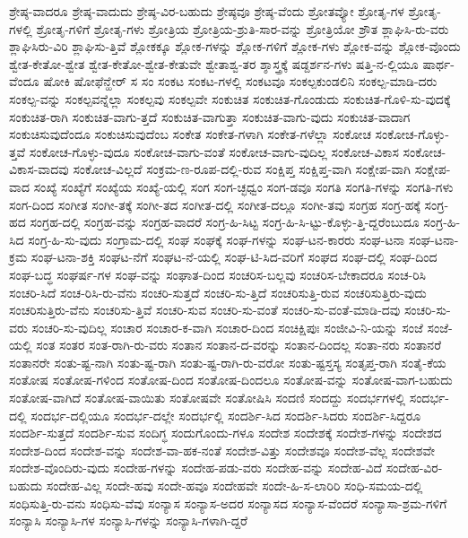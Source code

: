 {ಶ್ರೇಷ್ಠ-ವಾದರೂ
ಶ್ರೇಷ್ಠ-ವಾದುದು
ಶ್ರೇಷ್ಠ-ವಿರ-ಬಹುದು
ಶ್ರೇಷ್ಠವೂ
ಶ್ರೇಷ್ಠ-ವೆಂದು
ಶ್ರೋತವ್ಯೋ
ಶ್ರೋತೃ-ಗಳ
ಶ್ರೋತೃ-ಗಳಲ್ಲಿ
ಶ್ರೋತೃ-ಗಳಿಗೆ
ಶ್ರೋತೃ-ಗಳು
ಶ್ರೋತ್ರಿಯ
ಶ್ರೋತ್ರಿಯ-ಶ್ರುತಿ-ಸಾರ-ವನ್ನು
ಶ್ರೋತ್ರಿಯೋ
ಶ್ರೌತ
ಶ್ಲಾಘಿಸಿ-ರು-ವರು
ಶ್ಲಾಘಿಸಿರು-ವಿರಿ
ಶ್ಲಾಘಿಸು-ತ್ತಿವೆ
ಶ್ಲೋಕಕ್ಕೂ
ಶ್ಲೋಕ-ಗಳನ್ನು
ಶ್ಲೋಕ-ಗಳಿಗೆ
ಶ್ಲೋಕ-ಗಳು
ಶ್ಲೋಕ-ವನ್ನು
ಶ್ಲೋಕ-ವೊಂದು
ಶ್ವೇತ-ಕೇತೋ-ಶ್ವೇತ
ಶ್ವೇತ-ಕೇತೋ-ಶ್ವೇತ-ಕೇತುವೇ
ಶ್ವೇತಾಶ್ವ-ತರ
ಶ್ಶಾಸ್ತ್ರಕ್ಕೆ
ಷಡ್ದರ್ಶನ-ಗಳು
ಷತ್ತಿ-ನ-ಲ್ಲಿಯೂ
ಷಾರ್ಥ-ವೆಂದೂ
ಷೋಕಿ
ಷೋಫೆನ್ಹೇರ್
ಸ
ಸಂ
ಸಂಕಟ
ಸಂಕಟ-ಗಳಲ್ಲಿ
ಸಂಕಟವೂ
ಸಂಕಲ್ಪಕುಂಡಲಿನಿ
ಸಂಕಲ್ಪ-ಮಾಡಿ-ದರು
ಸಂಕಲ್ಪ-ವನ್ನು
ಸಂಕಲ್ಪವನ್ನೆಲ್ಲಾ
ಸಂಕಲ್ಪವು
ಸಂಕಲ್ಪವೇ
ಸಂಕುಚಿತ
ಸಂಕುಚಿತ-ಗೊಂಡುದು
ಸಂಕುಚಿತ-ಗೊಳಿ-ಸು-ವುದಕ್ಕೆ
ಸಂಕುಚಿತ-ರಾಗಿ
ಸಂಕುಚಿತ-ವಾಗು-ತ್ತದೆ
ಸಂಕುಚಿತ-ವಾಗುತ್ತಾ
ಸಂಕುಚಿತ-ವಾಗು-ವುದು
ಸಂಕುಚಿತ-ವಾದಾಗ
ಸಂಕುಚಿಸುವುದೆಂದೂ
ಸಂಕುಚಿಸುವುದೆಂಬ
ಸಂಕೇತ
ಸಂಕೇತ-ಗಳಾಗಿ
ಸಂಕೇತ-ಗಳೆಲ್ಲಾ
ಸಂಕೋಚ
ಸಂಕೋಚ-ಗೊಳ್ಳು-ತ್ತವೆ
ಸಂಕೋಚ-ಗೊಳ್ಳು-ವುದೂ
ಸಂಕೋಚ-ವಾಗು-ವಂತೆ
ಸಂಕೋಚ-ವಾಗು-ವುದಿಲ್ಲ
ಸಂಕೋಚ-ವಿಕಾಸ
ಸಂಕೋಚ-ವಿಕಾಸ-ವಾದವು
ಸಂಕೋಚ-ವಿಲ್ಲದೆ
ಸಂಕ್ರಮ-ಣ-ರೂಪ-ದಲ್ಲಿ-ರುವ
ಸಂಕ್ಷಿಪ್ತ
ಸಂಕ್ಷಿಪ್ತ-ವಾಗಿ
ಸಂಕ್ಷೇಪ-ವಾಗಿ
ಸಂಕ್ಷೇಪ-ವಾದ
ಸಂಖ್ಯೆ
ಸಂಖ್ಯೆಗೆ
ಸಂಖ್ಯೆಯ
ಸಂಖ್ಯೆ-ಯಲ್ಲಿ
ಸಂಗ
ಸಂಗ-ಚ್ಛಧ್ವಂ
ಸಂಗ-ಡವೂ
ಸಂಗತಿ
ಸಂಗತಿ-ಗಳನ್ನು
ಸಂಗತಿ-ಗಳು
ಸಂಗ-ದಿಂದ
ಸಂಗೀತ
ಸಂಗೀ-ತಕ್ಕೆ
ಸಂಗೀ-ತದ
ಸಂಗೀತ-ದಲ್ಲಿ
ಸಂಗೀತ-ದಲ್ಲೂ
ಸಂಗೀ-ತವು
ಸಂಗ್ರಹ
ಸಂಗ್ರ-ಹಕ್ಕೆ
ಸಂಗ್ರ-ಹದ
ಸಂಗ್ರಹ-ದಲ್ಲಿ
ಸಂಗ್ರಹ-ವನ್ನು
ಸಂಗ್ರಹ-ವಾದರೆ
ಸಂಗ್ರ-ಹಿ-ಸಿಟ್ಟ
ಸಂಗ್ರ-ಹಿ-ಸಿ-ಟ್ಟು-ಕೊಳ್ಳು-ತ್ತಿ-ದ್ದರೆಂಬುದೂ
ಸಂಗ್ರ-ಹಿ-ಸಿದ
ಸಂಗ್ರ-ಹಿ-ಸು-ವುದು
ಸಂಗ್ರಾಮ-ದಲ್ಲಿ
ಸಂಘ
ಸಂಘಕ್ಕೆ
ಸಂಘ-ಗಳನ್ನು
ಸಂಘ-ಟನ-ಕಾರರು
ಸಂಘ-ಟನಾ
ಸಂಘ-ಟನಾ-ಕ್ರಮ
ಸಂಘ-ಟನಾ-ಶಕ್ತಿ
ಸಂಘಟ-ನೆಗೆ
ಸಂಘಟ-ನೆ-ಯಲ್ಲಿ
ಸಂಘ-ಟಿ-ಸಿದ-ವರಿಗೆ
ಸಂಘದ
ಸಂಘ-ದಲ್ಲಿ
ಸಂಘ-ದಿಂದ
ಸಂಘ-ಬದ್ಧ
ಸಂಘರ್ಷ-ಗಳ
ಸಂಘ-ವನ್ನು
ಸಂಘಾತ-ದಿಂದ
ಸಂಚರಿಸ-ಬಲ್ಲವು
ಸಂಚರಿಸ-ಬೇಕಾದರೂ
ಸಂಚ-ರಿಸಿ
ಸಂಚರಿ-ಸಿದೆ
ಸಂಚ-ರಿಸಿ-ರು-ವೆನು
ಸಂಚರಿ-ಸುತ್ತದೆ
ಸಂಚರಿ-ಸು-ತ್ತಿದೆ
ಸಂಚರಿಸುತ್ತಿ-ರುವ
ಸಂಚರಿಸುತ್ತಿರು-ವುದು
ಸಂಚರಿಸುತ್ತಿರು-ವೆನು
ಸಂಚರಿಸು-ತ್ತಿವೆ
ಸಂಚರಿ-ಸುವ
ಸಂಚರಿ-ಸು-ವಂತೆ
ಸಂಚರಿ-ಸು-ವಂತೆ-ಮಾಡಿ-ದವು
ಸಂಚರಿ-ಸು-ವರು
ಸಂಚರಿ-ಸು-ವುದಿಲ್ಲ
ಸಂಚಾರ
ಸಂಚಾರ-ಕ-ವಾಗಿ
ಸಂಚಾರ-ದಿಂದ
ಸಂಚಿಕ್ಷಿಪುಃ
ಸಂಜೀವಿ-ನಿ-ಯನ್ನು
ಸಂಜೆ
ಸಂಜೆ-ಯಲ್ಲಿ
ಸಂತ
ಸಂತರ
ಸಂತ-ರಾಗಿ-ರು-ವರು
ಸಂತಾನ
ಸಂತಾನ-ದ-ವರನ್ನು
ಸಂತಾನ-ದಿಂದಲ್ಲ
ಸಂತಾ-ನರು
ಸಂತಾನರೆ
ಸಂತಾನರೇ
ಸಂತು-ಷ್ಟ-ನಾಗಿ
ಸಂತು-ಷ್ಟ-ರಾಗಿ
ಸಂತು-ಷ್ಟ-ರಾಗಿ-ರು-ವರೋ
ಸಂತು-ಷ್ಟಸ್ತಸ್ಯ
ಸಂತೃಪ್ತ-ರಾಗಿ
ಸಂತೈ-ಕೆಯ
ಸಂತೋಷ
ಸಂತೋಷ-ಗಳಿಂದ
ಸಂತೋಷ-ದಿಂದ
ಸಂತೋಷ-ದಿಂದಲೂ
ಸಂತೋಷ-ವನ್ನು
ಸಂತೋಷ-ವಾಗ-ಬಹುದು
ಸಂತೋಷ-ವಾಗಿದೆ
ಸಂತೋಷ-ವಾಯಿತು
ಸಂತೋಷವೇ
ಸಂತೋಷಿಸಿ
ಸಂದಣಿ
ಸಂದದ್ದು
ಸಂದರ್ಭಗಳಲ್ಲಿ
ಸಂದರ್ಭ-ದಲ್ಲಿ
ಸಂದರ್ಭ-ದಲ್ಲಿಯೂ
ಸಂದರ್ಭ-ದಲ್ಲೇ
ಸಂದರ್ಭಲ್ಲಿ
ಸಂದರ್ಶಿ-ಸಿದ
ಸಂದರ್ಶಿ-ಸಿದರು
ಸಂದರ್ಶಿ-ಸಿದ್ದರೂ
ಸಂದರ್ಶಿ-ಸುತ್ತದೆ
ಸಂದರ್ಶಿ-ಸುವ
ಸಂದಿಗ್ಧ
ಸಂದುಗೊಂದು-ಗಳೂ
ಸಂದೇಶ
ಸಂದೇಶಕ್ಕೆ
ಸಂದೇಶ-ಗಳನ್ನು
ಸಂದೇಶದ
ಸಂದೇಶ-ದಿಂದ
ಸಂದೇಶ-ವನ್ನು
ಸಂದೇಶ-ವಾ-ಹಕ-ನಂತೆ
ಸಂದೇಶ-ವಿತ್ತು
ಸಂದೇಶವೂ
ಸಂದೇಶ-ವೆಲ್ಲ
ಸಂದೇಶವೇ
ಸಂದೇಶ-ವೊಂದಿರು-ವುದು
ಸಂದೇಹ-ಗಳನ್ನು
ಸಂದೇಹ-ಪಡು-ವರು
ಸಂದೇಹ-ವನ್ನು
ಸಂದೇಹ-ವಿದೆ
ಸಂದೇಹ-ವಿರ-ಬಹುದು
ಸಂದೇಹ-ವಿಲ್ಲ
ಸಂದೇ-ಹವು
ಸಂದೇ-ಹವೂ
ಸಂದೇಹವೇ
ಸಂದೇ-ಹಿ-ಸ-ಲಾರಿರಿ
ಸಂಧಿ-ಸಮಯ-ದಲ್ಲಿ
ಸಂಧಿಸುತ್ತಿ-ರು-ವನು
ಸಂಧಿಸು-ವೆವು
ಸಂನ್ಯಾಸ
ಸಂನ್ಯಾಸ-ಅದರ
ಸಂನ್ಯಾಸದ
ಸಂನ್ಯಾಸ-ವೆಂದರೆ
ಸಂನ್ಯಾಸಾ-ಶ್ರಮ-ಗಳಿಗೆ
ಸಂನ್ಯಾಸಿ
ಸಂನ್ಯಾಸಿ-ಗಳ
ಸಂನ್ಯಾಸಿ-ಗಳನ್ನು
ಸಂನ್ಯಾಸಿ-ಗಳಾಗಿ-ದ್ದರೆ
}

